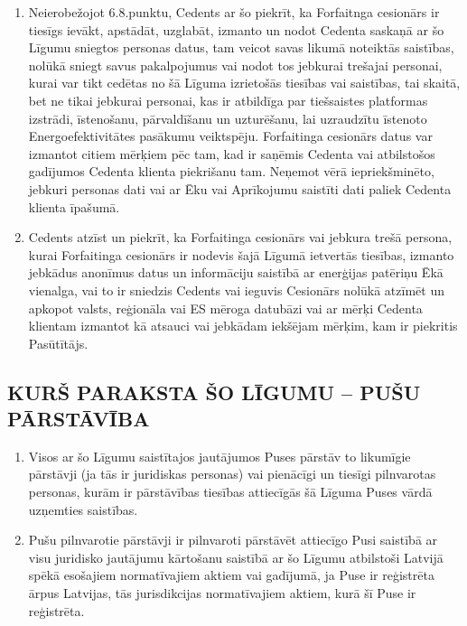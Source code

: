 \documentclass[a4paper]{article}
\begin{document}
\begin{multicols}{2}
\begin{enumerate}
  \item{Neierobežojot 6.8.punktu, Cedents ar šo piekrīt, ka Forfaitnga
cesionārs ir tiesīgs ievākt, apstādāt, uzglabāt, izmanto un nodot
Cedenta saskaņā ar šo Līgumu sniegtos personas datus, tam veicot
savas likumā noteiktās saistības, nolūkā sniegt savus pakalpojumus
vai nodot tos jebkurai trešajai personai, kurai var tikt cedētas no šā
Līguma izrietošās tiesības vai saistības, tai skaitā, bet ne tikai jebkurai
personai, kas ir atbildīga par tiešsaistes platformas izstrādi,
īstenošanu, pārvaldīšanu un uzturēšanu, lai uzraudzītu īstenoto
Energoefektivitātes pasākumu veiktspēju. Forfaitinga cesionārs
datus var izmantot citiem mērķiem pēc tam, kad ir saņēmis Cedenta
vai atbilstošos gadījumos Cedenta klienta piekrišanu tam. Neņemot
vērā iepriekšminēto, jebkuri personas dati vai ar Ēku vai Aprīkojumu
saistīti dati paliek Cedenta klienta īpašumā.}

  \item{Cedents atzīst un piekrīt, ka Forfaitinga cesionārs vai jebkura trešā
persona, kurai Forfaitinga cesionārs ir nodevis šajā Līgumā ietvertās
tiesības, izmanto jebkādus anonīmus datus un informāciju saistībā ar
enerģijas patēriņu Ēkā vienalga, vai to ir sniedzis Cedents vai ieguvis
Cesionārs nolūkā atzīmēt un apkopot valsts, reģionāla vai ES mēroga
datubāzi vai ar mērķi Cedenta klientam izmantot kā atsauci vai
jebkādam iekšējam mērķim, kam ir piekritis Pasūtītājs.}
  \end{enumerate}

  \subsection{KURŠ PARAKSTA ŠO LĪGUMU – PUŠU PĀRSTĀVĪBA}

  \begin{enumerate}
  \item{Visos ar šo Līgumu saistītajos jautājumos Puses pārstāv to likumīgie
pārstāvji (ja tās ir juridiskas personas) vai pienācīgi un tiesīgi
pilnvarotas personas, kurām ir pārstāvības tiesības attiecīgās šā
Līguma Puses vārdā uzņemties saistības.}

  \item{Pušu pilnvarotie pārstāvji ir pilnvaroti pārstāvēt attiecīgo Pusi
saistībā ar visu juridisko jautājumu kārtošanu saistībā ar šo Līgumu
atbilstoši Latvijā spēkā esošajiem normatīvajiem aktiem vai
gadījumā, ja Puse ir reģistrēta ārpus Latvijas, tās jurisdikcijas
normatīvajiem aktiem, kurā šī Puse ir reģistrēta.}


\end{enumerate}
\end{multicols}
\end{document}

